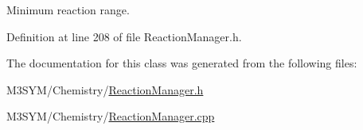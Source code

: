 Minimum reaction range. 



Definition at line 208 of file Reaction\+Manager.\+h.



The documentation for this class was generated from the following files\+:\begin{DoxyCompactItemize}
\item 
M3\+S\+Y\+M/\+Chemistry/\hyperlink{ReactionManager_8h}{Reaction\+Manager.\+h}\item 
M3\+S\+Y\+M/\+Chemistry/\hyperlink{ReactionManager_8cpp}{Reaction\+Manager.\+cpp}\end{DoxyCompactItemize}

